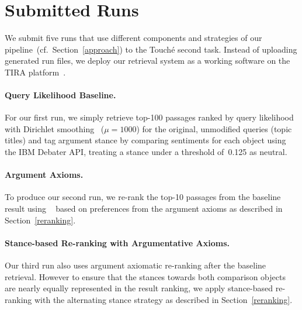 \section{Submitted Runs}
\label{runs}


We submit five runs that use different components and strategies of our pipeline~(cf.\ Section~\ref{approach}) to the Touch{\'e} second task.
Instead of uploading generated run files, we deploy our retrieval system as a working software on the TIRA platform~\cite{PotthastGWS2019}.

\paragraph{Query Likelihood Baseline.}

For our first run, we simply retrieve top-100 passages ranked by query likelihood with Dirichlet smoothing~\cite{ZhaiL2001} (\(\mu = 1000\)) for the original, unmodified queries (topic titles) and tag argument stance by comparing sentiments for each object using the IBM Debater API, treating a stance under a threshold of~0.125 as neutral.

\paragraph{Argument Axioms.}

To produce our second run, we re-rank the top-10 passages from the baseline result using \KwikSort~\cite{BondarenkoFRSVH2022,HagenVGS2016} based on preferences from the argument axioms as described in Section~\ref{reranking}.

\paragraph{Stance-based Re-ranking with Argumentative Axioms.}

Our third run also uses argument axiomatic re-ranking after the baseline retrieval. However to ensure that the stances towards both comparison objects are nearly equally represented in the result ranking, we apply stance-based re-ranking with the alternating stance strategy as described in Section~\ref{reranking}.

